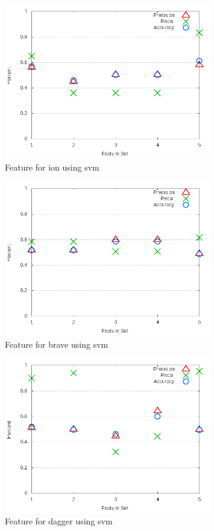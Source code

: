 \begin{figure}[!t]
\centering
\includegraphics[width=0.8\textwidth]{images/svm/test_3/ion_sample_range.png}
\caption{Feature for ion using \gls{svm}}
\label{fig:test_3_ion_svm}
\end{figure}

\begin{figure}[!t]
\centering
\includegraphics[width=0.8\textwidth]{images/svm/test_3/brave_sample_range.png}
\caption{Feature for brave using \gls{svm}}
\label{fig:test_3_brave_svm}
\end{figure}

\begin{figure}[!t]
\centering
\includegraphics[width=0.8\textwidth]{images/svm/test_3/dagger_sample_range.png}
\caption{Feature for dagger using \gls{svm}}
\label{fig:test_3_dagger_svm}
\end{figure}

